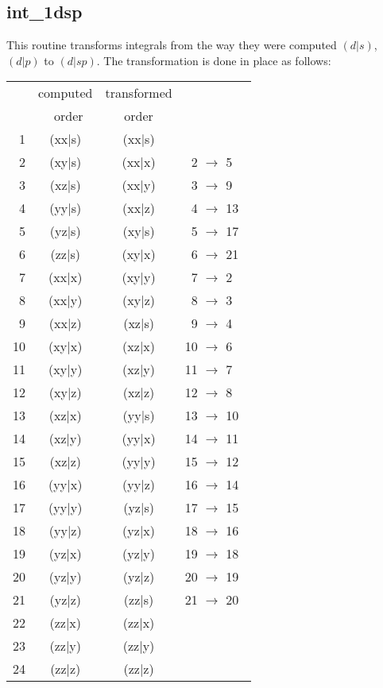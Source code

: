 \subsection{int\_1dsp} 
This routine transforms integrals from the way they 
were computed $(d|s)$, $(d|p)$ to $(d|sp)$. 
The transformation is done in place as follows: 
\begin{tabular}{rccc}       
  &  computed  & transformed & \\ 
  &  ~order    &  order & \\ 
~1 & (xx$|$s)  &  (xx$|$s)  & \\ 
~2 & (xy$|$s)  &  (xx$|$x)  &  ~2 $\rightarrow$ 5~~ \\ 
~3 & (xz$|$s)  &  (xx$|$y)  &  ~3 $\rightarrow$ 9~~ \\ 
~4 & (yy$|$s)  &  (xx$|$z)  &  ~4 $\rightarrow$ 13~ \\ 
~5 & (yz$|$s)  &  (xy$|$s)  &  ~5 $\rightarrow$ 17~ \\ 
~6 & (zz$|$s)  &  (xy$|$x)  &  ~6 $\rightarrow$ 21~ \\ 
~7 & (xx$|$x)  &  (xy$|$y)  &  ~7 $\rightarrow$ 2~~ \\ 
~8 & (xx$|$y)  &  (xy$|$z)  &  ~8 $\rightarrow$ 3~~ \\ 
~9 & (xx$|$z)  &  (xz$|$s)  &  ~9 $\rightarrow$ 4~~ \\ 
10 & (xy$|$x)  &  (xz$|$x)  &  10 $\rightarrow$ 6~~ \\ 
11 & (xy$|$y)  &  (xz$|$y)  &  11 $\rightarrow$ 7~~ \\ 
12 & (xy$|$z)  &  (xz$|$z)  &  12 $\rightarrow$ 8~~ \\ 
13 & (xz$|$x)  &  (yy$|$s)  &  13 $\rightarrow$ 10~ \\ 
14 & (xz$|$y)  &  (yy$|$x)  &  14 $\rightarrow$ 11~ \\ 
15 & (xz$|$z)  &  (yy$|$y)  &  15 $\rightarrow$ 12~ \\ 
16 & (yy$|$x)  &  (yy$|$z)  &  16 $\rightarrow$ 14~ \\ 
17 & (yy$|$y)  &  (yz$|$s)  &  17 $\rightarrow$ 15~ \\ 
18 & (yy$|$z)  &  (yz$|$x)  &  18 $\rightarrow$ 16~ \\ 
19 & (yz$|$x)  &  (yz$|$y)  &  19 $\rightarrow$ 18~ \\ 
20 & (yz$|$y)  &  (yz$|$z)  &  20 $\rightarrow$ 19~ \\ 
21 & (yz$|$z)  &  (zz$|$s)  &  21 $\rightarrow$ 20~ \\ 
22 & (zz$|$x)  &  (zz$|$x)  & \\ 
23 & (zz$|$y)  &  (zz$|$y)  & \\ 
24 & (zz$|$z)  &  (zz$|$z)  & \\ 
\end{tabular} 
 
